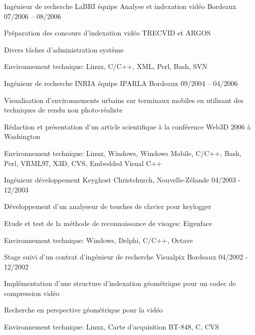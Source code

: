 \begin{cventries}
  \cventry
    {Ingénieur de recherche}
    {LaBRI équipe Analyse et indexation vidéo}
    {Bordeaux}
    {07/2006 – 08/2006}
    {
      \begin{cvitems}
        \item {Préparation des concours d'indexation vidéo TRECVID et ARGOS}
        \item {Divers tâches d'administration système}
        \item {Environnement technique: Linux, C/C++, XML, Perl, Bash, SVN}
      \end{cvitems}
    }

  \cventry
    {Ingénieur de recherche}
    {INRIA équipe IPARLA}
    {Bordeaux}
    {09/2004 – 04/2006}
    {
      \begin{cvitems}
        \item {Visualisation d'environnements urbains sur terminaux mobiles en utilisant des techniques de
rendu non photo-réaliste}
        \item {Rédaction et présentation d'un article scientifique à la conférence Web3D 2006 à Washington}
        \item {Environnement technique: Linux, Windows, Windows Mobile, C/C++, Bash, Perl, VRML97, X3D, CVS, Embedded Visual C++}
      \end{cvitems}
    }

  \cventry
    {Ingénieur développement}
    {Keyghost}
    {Christchurch, Nouvelle-Zélande}
    {04/2003 - 12/2003}
    {
      \begin{cvitems}
        \item {Développement d'un analyseur de touches de clavier pour keylogger}
        \item {Etude et test de la méthode de reconnaissance de visages: Eigenface}
		\item {Environnement technique: Windows, Delphi, C/C++, Octave}
      \end{cvitems}
    }

  \cventry
    {Stage suivi d'un contrat d'ingénieur de recherche}
    {Visualpix}
    {Bordeaux}
    {04/2002 - 12/2002}
    {
      \begin{cvitems}
        \item {Implémentation d'une structure d'indexation géométrique pour un codec de compression vidéo}
		\item {Recherche en perspective géométrique pour la vidéo}
		\item {Environnement technique: Linux, Carte d'acquisition BT-848, C, CVS}
      \end{cvitems}
    }


\end{cventries}
